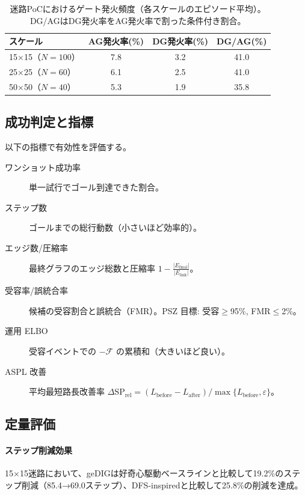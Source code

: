 \documentclass[ja=standard,xelatex]{bxjsarticle}
\newcommand{\F}{\mathcal{F}}
\newcommand{\experimNote}[1]{}
\begin{document}
\experimNote{50×50の大規模実験は現在20エピソードのみ。追加40エピソードを実施予定}

\begin{table}[H]
\centering
\small
\caption{迷路PoCにおけるゲート発火頻度（各スケールのエピソード平均）。DG/AGはDG発火率をAG発火率で割った条件付き割合。}
\label{tab:maze_gate_stats}
\begin{tabular}{lccc}
\toprule
スケール & AG発火率(\%) & DG発火率(\%) & DG/AG(\%) \\
\midrule
15×15（$N{=}100$） & 7.8 & 3.2 & 41.0 \\
25×25（$N{=}60$） & 6.1 & 2.5 & 41.0 \\
50×50（$N{=}40$） & 5.3 & 1.9 & 35.8 \\
\bottomrule
\end{tabular}
\end{table}

\subsection{成功判定と指標}
\label{sec:maze_success_metrics}
以下の指標で有効性を評価する。
\begin{description}
  \item[ワンショット成功率] 単一試行でゴール到達できた割合。
  \item[ステップ数] ゴールまでの総行動数（小さいほど効率的）。
  \item[エッジ数/圧縮率] 最終グラフのエッジ総数と圧縮率 $1-\frac{|E_{\mathrm{final}}|}{|E_{\mathrm{link}}|}$。
  \item[受容率/誤統合率] 候補の受容割合と誤統合（FMR）。PSZ 目標: 受容$\ge$95\%, FMR$\le$2\%。
  \item[運用 ELBO] 受容イベントでの $-\F$ の累積和（大きいほど良い）。
  \item[ASPL 改善] 平均最短路長改善率 $\Delta\mathrm{SP}_{\mathrm{rel}}=(L_{\mathrm{before}}-L_{\mathrm{after}})/\max\{L_{\mathrm{before}},\varepsilon\}$。
\end{description}

\subsection{定量評価}

\paragraph{ステップ削減効果}
15×15迷路において、geDIGは好奇心駆動ベースラインと比較して19.2\%のステップ削減（85.4→69.0ステップ）、DFS-inspiredと比較して25.8\%の削減を達成。
\end{document}
